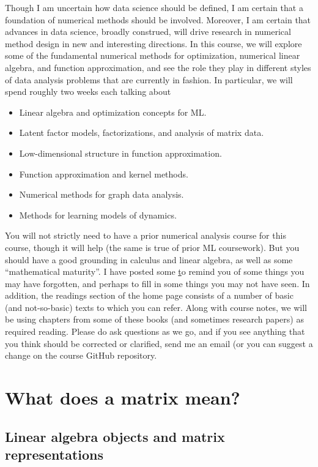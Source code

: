 \documentclass[12pt, leqno]{article} %
\begin{document}
Though I am uncertain how data science should be defined, I am certain
that a foundation of numerical methods should be involved.  Moreover,
I am certain that advances in data science, broadly construed, will
drive research in numerical method design in new and interesting
directions.  In this course, we will explore some of the fundamental
numerical methods for optimization, numerical linear algebra, and
function approximation, and see the role they play in different styles of
data analysis problems that are currently in fashion.  In particular,
we will spend roughly two weeks each talking about
\begin{itemize}
\item Linear algebra and optimization concepts for ML.
\item Latent factor models, factorizations, and analysis of
  matrix data.
\item Low-dimensional structure in function approximation.
\item Function approximation and kernel methods.
\item Numerical methods for graph data analysis.
\item Methods for learning models of dynamics.
\end{itemize}

You will not strictly need to have a prior numerical analysis course
for this course, though it will help (the same is true of prior ML
coursework).  But you should have a good grounding in calculus and
linear algebra, as well as some ``mathematical maturity''.  I have
posted some
\href{https://www.cs.cornell.edu/courses/cs6241/2021sp/background.pdf}
to remind you of some things you may have forgotten, and perhaps to
fill in some things you may not have seen.  In addition, the readings
section of the home page consists of a number of basic (and
not-so-basic) texts to which you can refer.  Along with course notes,
we will be using chapters from some of these books (and sometimes
research papers) as required reading.  Please do ask questions as we
go, and if you see anything that you think should be corrected or
clarified, send me an email (or you can suggest a change on the course
GitHub repository.

\section{What does a matrix mean?}

\subsection{Linear algebra objects and matrix representations}
\end{document}
